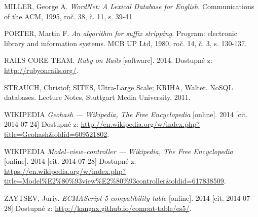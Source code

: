 \begin{thebibliography}{99}
  MILLER, George A.
  \emph{WordNet: A Lexical Database for English}.
  Communications of the ACM, 1995, roč. 38, č. 11, s. 39-41.

  PORTER, Martin F.
  \emph{An algorithm for suffix stripping}.
  Program: electronic library and information systems. MCB UP Ltd, 1980, roč. 14, č. 3, s. 130-137.

  RAILS CORE TEAM. \textit{Ruby on Rails} [software]. 2014.
  Dostupné z: \url{http://rubyonrails.org/}.

  STRAUCH, Christof; SITES, Ultra-Large Scale; KRIHA, Walter. NoSQL databases. Lecture Notes, Stuttgart Media University, 2011.

  WIKIPEDIA
  \emph{Geohash --- Wikipedia{,} The Free Encyclopedia} [online]. 2014 [cit. 2014-07-24]
  Dostupné z: \url{http://en.wikipedia.org/w/index.php?title=Geohash&oldid=609521802}.

  WIKIPEDIA
  \emph{Model–view–controller --- Wikipedia{,} The Free Encyclopedia} [online]. 2014 [cit. 2014-07-28]
  Dostupné z: \url{https://en.wikipedia.org/w/index.php?title=Model%E2%80%93view%E2%80%93controller&oldid=617838509}.

  ZAYTSEV, Juriy. \textit{ECMAScript 5 compatibility table} [online]. 2014 [cit. 2014-07-28]
  Dostupné z: \url{http://kangax.github.io/compat-table/es5/}.


\end{thebibliography}



